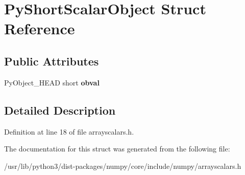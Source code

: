 \hypertarget{structPyShortScalarObject}{}\section{Py\+Short\+Scalar\+Object Struct Reference}
\label{structPyShortScalarObject}
\subsection*{Public Attributes}
\begin{DoxyCompactItemize}
\item 
Py\+Object\+\_\+\+H\+E\+AD short {\bfseries obval}\hypertarget{structPyShortScalarObject_a04ed52238be1cd69f5805374267b454e}{}\label{structPyShortScalarObject_a04ed52238be1cd69f5805374267b454e}

\end{DoxyCompactItemize}


\subsection{Detailed Description}


Definition at line 18 of file arrayscalars.\+h.



The documentation for this struct was generated from the following file\+:\begin{DoxyCompactItemize}
\item 
/usr/lib/python3/dist-\/packages/numpy/core/include/numpy/arrayscalars.\+h\end{DoxyCompactItemize}
